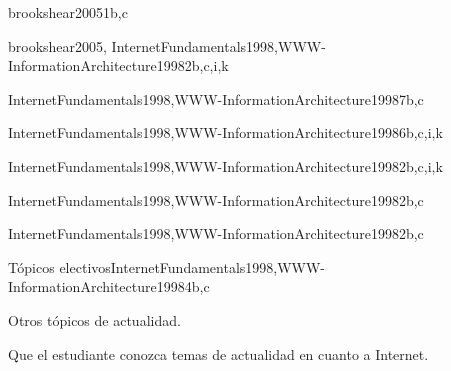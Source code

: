 \begin{syllabus}
\begin{unit}{\IMInformationManagementConcepts}{}{brookshear2005}{1}{b,c}
   \IMInformationManagementConceptsAllTopics
   \IMInformationManagementConceptsAllLearningOutcomes
\end{unit}

\begin{unit}{\SEToolsandEnvironments}{}{brookshear2005, InternetFundamentals1998,WWW-InformationArchitecture1998}{2}{b,c,i,k}
   \SEToolsandEnvironmentsAllTopics
   \SEToolsandEnvironmentsAllLearningOutcomes
\end{unit}

\begin{unit}{\PBDWebPlatforms}{}{InternetFundamentals1998,WWW-InformationArchitecture1998}{7}{b,c}
   \PBDWebPlatformsAllTopics
   \PBDWebPlatformsAllLearningOutcomes
\end{unit}

\begin{unit}{\NCNetworkedApplications}{}{InternetFundamentals1998,WWW-InformationArchitecture1998}{6}{b,c,i,k}
   \NCNetworkedApplicationsAllTopics
   \NCNetworkedApplicationsAllLearningOutcomes
\end{unit}

\begin{unit}{\PLObjectOrientedProgramming}{}{InternetFundamentals1998,WWW-InformationArchitecture1998}{2}{b,c,i,k}
   \PLObjectOrientedProgrammingAllTopics
   \PLObjectOrientedProgrammingAllLearningOutcome
\end{unit}

\begin{unit}{\IMMultimediaSystems}{}{InternetFundamentals1998,WWW-InformationArchitecture1998}{2}{b,c}
   \IMMultimediaSystemsAllTopics
   \IMMultimediaSystemsAllLearningOutcomes
\end{unit}

\begin{unit}{\SESoftwareProjectManagement}{}{InternetFundamentals1998,WWW-InformationArchitecture1998}{2}{b,c}
   \SESoftwareProjectManagementAllTopics
   \SESoftwareProjectManagementAllLearningOutcomes
\end{unit}

\begin{unit}{Tópicos electivos}{}{InternetFundamentals1998,WWW-InformationArchitecture1998}{4}{b,c}
\begin{topics}
      \item Otros tópicos de actualidad.
   \end{topics}
   \begin{learningoutcomes}
      \item Que el estudiante conozca temas de actualidad en cuanto a Internet.
   \end{learningoutcomes}
\end{unit}

\begin{coursebibliography}
\end{coursebibliography}

\end{syllabus}

%

